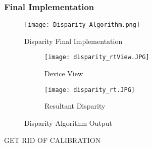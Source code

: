 \subsubsection{Final Implementation}
\begin{figure}[H]
	\centerline{\texttt{[image: Disparity\_Algorithm.png]}}
	\caption{Disparity Final Implementation}
	\label{disparityTestImp}
\end{figure}
\par
\begin{figure}[H] 
	\begin{subfigure}{0.5\textwidth}
	\centering
		\texttt{[image: disparity\_rtView.JPG]}
		\caption{Device View}
	\end{subfigure}
	\begin{subfigure}{0.5\textwidth}
	\centering
		\texttt{[image: disparity\_rt.JPG]}
		\caption{Resultant Disparity}
	\end{subfigure}
	\caption{Disparity Algorithm Output}
	\label{disparityFin}
\end{figure}
\par
GET RID OF CALIBRATION 